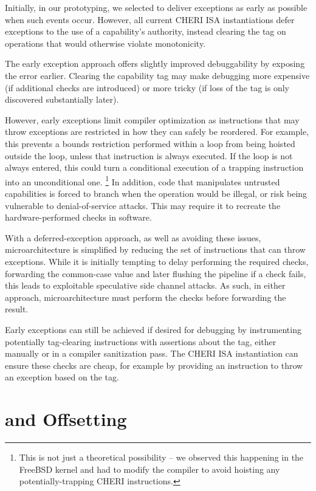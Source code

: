 Initially, in our prototyping, we selected to deliver exceptions as early as
possible when such events occur.
However, all current CHERI ISA instantiations defer exceptions to the use
of a capability's authority, instead clearing the tag on operations that
would otherwise violate monotonicity.

The early exception approach offers slightly improved debuggability
by exposing the error earlier.
Clearing the capability tag may make debugging more expensive (if additional checks are
introduced) or more tricky (if loss of the tag is only discovered substantially later).

However, early exceptions limit compiler optimization as instructions that may
throw exceptions are restricted in how they can safely be reordered.
For example, this prevents a bounds restriction performed within a loop from
being hoisted outside the loop, unless that instruction is always executed.
If the loop is not always entered, this could turn a conditional execution
of a trapping instruction into an unconditional one.%
\footnote{This is not just a theoretical possibility -- we observed this
 happening in the FreeBSD kernel and had to modify the compiler to avoid
 hoisting any potentially-trapping CHERI instructions.}
In addition, code that manipulates untrusted capabilities is forced to branch
when the operation would be illegal, or risk being vulnerable to
denial-of-service attacks.
This may require it to recreate the hardware-performed checks in software.

With a deferred-exception approach, as well as avoiding these issues,
microarchitecture is simplified by reducing the set of instructions that can
throw exceptions.
While it is initially tempting to delay performing the required checks,
forwarding the common-case value and later flushing the pipeline if a check
fails, this leads to exploitable speculative side channel attacks.
As such, in either approach, microarchitecture must perform the checks
before forwarding the result.

Early exceptions can still be achieved if desired for debugging by
instrumenting potentially tag-clearing instructions with assertions about
the tag, either manually or in a compiler sanitization pass.
The CHERI ISA instantiation can ensure these checks are cheap, for example by
providing an instruction to throw an exception based on the tag.

\section{\DDC{} and \PCC{} Offsetting}

